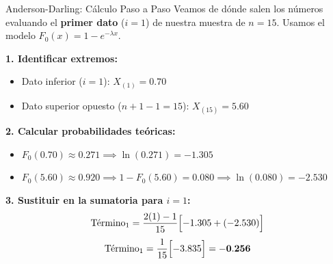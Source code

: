 \documentclass[aspectratio=1610, 10pt]{beamer}
\begin{document}
\begin{frame}{Anderson-Darling: Cálculo Paso a Paso}
Veamos de dónde salen los números evaluando el \textbf{primer dato} ($i=1$) de nuestra muestra de $n=15$. Usamos el modelo $F_0(x) = 1 - e^{-\lambda x}$.

\vspace{0.2cm}
\textbf{1. Identificar extremos:}
\begin{itemize}
    \item Dato inferior ($i=1$): $X_{(1)} = \mathbf{0.70}$
    \item Dato superior opuesto ($n+1-1 = 15$): $X_{(15)} = \mathbf{5.60}$
\end{itemize}

\textbf{2. Calcular probabilidades teóricas:}
\begin{itemize}
    \item $F_0(0.70) \approx \mathbf{0.271} \implies \ln(0.271) = -1.305$
    \item $F_0(5.60) \approx \mathbf{0.920} \implies 1 - F_0(5.60) = \mathbf{0.080} \implies \ln(0.080) = -2.530$
\end{itemize}

\textbf{3. Sustituir en la sumatoria para $i=1$:}
$$ \text{Término}_1 = \frac{2(1)-1}{15} \Bigl[ -1.305 + (-2.530) \Bigr] $$
$$ \text{Término}_1 = \frac{1}{15} \Bigl[ -3.835 \Bigr] = \mathbf{-0.256} $$
\end{frame}
\end{document}

